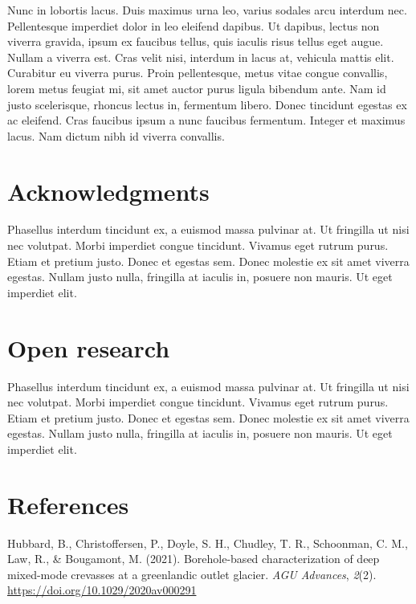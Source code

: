 \documentclass[
]{agujournal2019}
\newlength{\cslhangindent}
\newlength{\cslentryspacingunit} %
\newenvironment{CSLReferences}[2] %
 {%
  \setlength{\parindent}{0pt}
  \ifodd #1
  \let\oldpar\par
  \def\par{\hangindent=\cslhangindent\oldpar}
  \fi
  \setlength{\parskip}{#2\cslentryspacingunit}
 }%
 {}
\begin{document}
Nunc in lobortis lacus. Duis maximus urna leo, varius sodales arcu
interdum nec. Pellentesque imperdiet dolor in leo eleifend dapibus. Ut
dapibus, lectus non viverra gravida, ipsum ex faucibus tellus, quis
iaculis risus tellus eget augue. Nullam a viverra est. Cras velit nisi,
interdum in lacus at, vehicula mattis elit. Curabitur eu viverra purus.
Proin pellentesque, metus vitae congue convallis, lorem metus feugiat
mi, sit amet auctor purus ligula bibendum ante. Nam id justo
scelerisque, rhoncus lectus in, fermentum libero. Donec tincidunt
egestas ex ac eleifend. Cras faucibus ipsum a nunc faucibus fermentum.
Integer et maximus lacus. Nam dictum nibh id viverra convallis.

\hypertarget{acknowledgments}{%
\section{Acknowledgments}\label{acknowledgments}}

Phasellus interdum tincidunt ex, a euismod massa pulvinar at. Ut
fringilla ut nisi nec volutpat. Morbi imperdiet congue tincidunt.
Vivamus eget rutrum purus. Etiam et pretium justo. Donec et egestas sem.
Donec molestie ex sit amet viverra egestas. Nullam justo nulla,
fringilla at iaculis in, posuere non mauris. Ut eget imperdiet elit.

\hypertarget{open-research}{%
\section{Open research}\label{open-research}}

Phasellus interdum tincidunt ex, a euismod massa pulvinar at. Ut
fringilla ut nisi nec volutpat. Morbi imperdiet congue tincidunt.
Vivamus eget rutrum purus. Etiam et pretium justo. Donec et egestas sem.
Donec molestie ex sit amet viverra egestas. Nullam justo nulla,
fringilla at iaculis in, posuere non mauris. Ut eget imperdiet elit.

\hypertarget{references}{%
\section*{References}\label{references}}

\hypertarget{refs}{}
\begin{CSLReferences}{1}{0}
\vspace{1em}

\leavevmode{}%
Hubbard, B., Christoffersen, P., Doyle, S. H., Chudley, T. R.,
Schoonman, C. M., Law, R., \& Bougamont, M. (2021). Borehole-based
characterization of deep mixed-mode crevasses at a greenlandic outlet
glacier. \emph{{AGU} Advances}, \emph{2}(2).
\url{https://doi.org/10.1029/2020av000291}

\end{CSLReferences}
\end{document}
